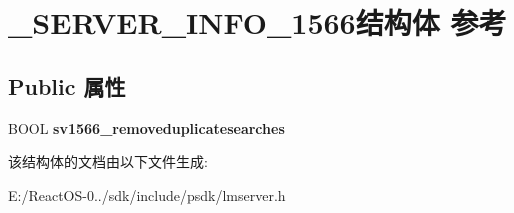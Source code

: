 \hypertarget{struct___s_e_r_v_e_r___i_n_f_o__1566}{}\section{\+\_\+\+S\+E\+R\+V\+E\+R\+\_\+\+I\+N\+F\+O\+\_\+1566结构体 参考}
\label{struct___s_e_r_v_e_r___i_n_f_o__1566}
\subsection*{Public 属性}
\begin{DoxyCompactItemize}
\item 
\mbox{\label{struct___s_e_r_v_e_r___i_n_f_o__1566_a2c8849bc678704fba1217cb8e8370a5a}} 
B\+O\+OL {\bfseries sv1566\+\_\+removeduplicatesearches}
\end{DoxyCompactItemize}


该结构体的文档由以下文件生成\+:\begin{DoxyCompactItemize}
\item 
E\+:/\+React\+O\+S-\/0../sdk/include/psdk/lmserver.\+h\end{DoxyCompactItemize}
